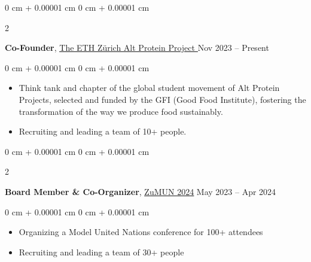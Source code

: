 \documentclass[10pt, letterpaper]{article}
\newenvironment{highlights}{
    \begin{itemize}[
        topsep=0.10 cm,
        parsep=0.10 cm,
        partopsep=0pt,
        itemsep=0pt,
        leftmargin=0 cm + 10pt
    ]
}{
    \end{itemize}
} %
\newenvironment{onecolentry}{
    \begin{adjustwidth}{
        0 cm + 0.00001 cm
    }{
        0 cm + 0.00001 cm
    }
}{
    \end{adjustwidth}
} %
\newenvironment{twocolentry}[2][]{
    \onecolentry
    \def\secondColumn{#2}
    \setcolumnwidth{\fill, 4.5 cm}
    \begin{paracol}{2}
}{
    \switchcolumn \raggedleft \secondColumn
    \end{paracol}
    \endonecolentry
} %
\begin{document}
        \vspace{0.2 cm}




      
        \begin{twocolentry}{
            Nov 2023 – Present
        }
    
            \textbf{Co-Founder}, \href{https://ethzurichaltpro.wordpress.com/}{\underline{The ETH Zürich Alt Protein Project }}\end{twocolentry}


        \vspace{0.10 cm}
        \begin{onecolentry}
            \begin{highlights}
                \item Think tank and chapter of the global student movement of Alt Protein Projects, selected and funded by the GFI (Good Food Institute), fostering the transformation of the way we produce food sustainably.
                \item Recruiting and leading a team of 10+ people.
            \end{highlights}
        \end{onecolentry}



         \vspace{0.2 cm}


         
        \begin{twocolentry}{
            May 2023 – Apr 2024
        }
            \textbf{Board Member \& Co-Organizer}, \href{https://zumun.ch/secretariat/}{\underline{ZuMUN 2024}}\end{twocolentry}
            \vspace{0.10 cm}
        \begin{onecolentry}
            \begin{highlights}
                \item Organizing a Model United Nations conference for 100+ attendees
                \item Recruiting and leading a team of 30+ people
            \end{highlights}
        \end{onecolentry}

        \vspace{0.2 cm}



          
\end{document}
